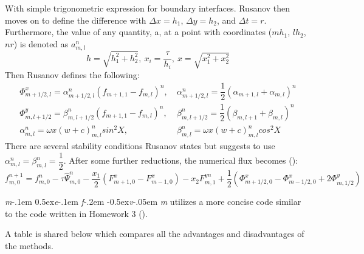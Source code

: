 \documentclass[a4paper, 12pt]{article}
\newcommand\mefvm{%
    \textit{m}\kern-.1em%
    \raise0.5ex\hbox{\textit{e}}\kern-.1em%
    \textit{f}\kern-.2em%
    \raise-0.5ex\hbox{\textit{v}}\kern-.05em%
    \textit{m}
}
\begin{document}
With simple trigonometric expression for boundary interfaces. Rusanov then moves on to define the difference with $\Delta x = h_1$, $\Delta y=h_2$, and $\Delta t=r$. Furthermore, the value of any quantity, a, at a point with coordinates ($mh_1$, $lh_2$, $nr$) is denoted as $a_{m,l}^n$
\begin{equation}
    h = \sqrt{h_1^2+h_2^2},\: x_i = \dfrac{\tau}{h_i},\: x=\sqrt{x_1^2+x_2^2}
\end{equation}
Then Rusanov defines the following:
\begin{equation}
\begin{split}    
    \Phi^x_{m+1/2,l}=\alpha^n_{m+1/2,l}(f_{m+1,1}-f_{m,l})^n,&\:\alpha^n_{m+1/2,l}=\dfrac{1}{2}(\alpha_{m+1,l}+\alpha_{m,l})^n \\
    \Phi^y_{m,l+1/2}=\beta^n_{m,l+1/2}(f_{m+1,1}-f_{m,l})^n,&\:\beta^n_{m,l+1/2}=\dfrac{1}{2}(\beta_{m,l+1}+\beta_{m,l})^n \\
    \alpha^n_{m,l}=\omega x(w+c)^n_{m,l}sin^2X,&\:\beta^n_{m,l}=\omega x(w+c)^n_{m,l}cos^2X
\end{split}
\end{equation}
There are several stability conditions Rusanov states but suggests to use $\alpha^n_{m,l}=\beta^n_{m,l}=\dfrac{1}{2}$. After some further reductions, the numerical flux becomes (\cite{rusanov}):
\begin{equation}
    f^{n+1}_{m,0}=f^n_{m,0}-\tau\hat\Psi^n_{m,0}-\dfrac{x_1}{2}(F^x_{m+1,0}-F^x_{m-1,0})-x_2F^{yn}_{m,1}+\dfrac{1}{2}(\Phi^x_{m+1/2,0}-\Phi^x_{m-1/2,0}+2\Phi^y_{m,1/2})
\end{equation}\par
\mefvm utilizes a more concise code similar to the code written in Homework 3 (\cite{hw3}). \\\par
A table is shared below which compares all the advantages and disadvantages of the methods.
\end{document}
